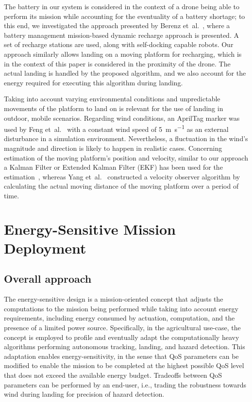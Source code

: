 \documentclass[conference]{IEEEtran}
\begin{document}
The battery in our system is considered in the context of a drone
being able to perform its mission while accounting for the eventuality
of a battery shortage; to this end, we investigated the approach
presented by Berenz et~al.~\cite{berenz2012autonomous}, where a
battery management mission-based dynamic recharge approach is
presented. A set of recharge stations are used, along with
self-docking capable robots. Our approach similarly allows landing on
a moving platform for recharging, which is in the context of this
paper is considered in the proximity of the drone. The actual landing
is handled by the proposed algorithm, and we also account for the
energy required for executing this algorithm during landing.
%

Taking into account varying environmental conditions and unpredictable
movements of the platform to land on is relevant for the use of
landing in outdoor, mobile scenarios.  Regarding wind conditions, an
AprilTag marker was used by Feng et~al.~\cite{feng2018autonomous} with
a constant wind speed of \SI{5}{\m \per \s} as an external disturbance in a
simulation environment. Nevertheless, a fluctuation in the wind's
magnitude and direction is likely to happen in realistic cases.
Concerning estimation of the moving platform's position and velocity,
similar to our approach a Kalman Filter or Extended Kalman Filter (EKF) has been used for the
estimation~\cite{araar2017vision,feng2018autonomous,
  falanga2017vision}, whereas Yang et~al.~\cite{yang2018hybrid}
constructed a velocity observer algorithm by calculating the actual
moving distance of the moving platform over a period of time.



\section{Energy-Sensitive Mission Deployment} 
\label{sec:approach}

\subsection{Overall approach}

The energy-sensitive design is a mission-oriented concept that adjusts
the computations to the mission being performed while taking into
account energy requirements, including energy consumed by actuation,
computation, and the presence of a limited power source. Specifically,
in the agricultural use-case, the concept is employed to profile and eventually adapt the
computationally heavy algorithms performing autonomous tracking,
landing, and hazard detection. This adaptation enables
energy-sensitivity, in the sense that QoS parameters can be modified
to enable the mission to be completed at the highest possible QoS
level that does not exceed the available energy budget. Tradeoffs
between QoS parameters can be performed by an end-user, i.e., trading
the robustness towards wind during landing for precision of hazard
detection.
\end{document}

